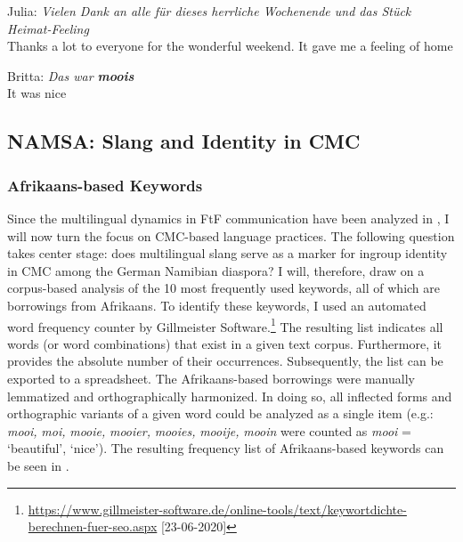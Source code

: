 \documentclass[output=paper]{langsci/langscibook}
\begin{document}
\ea\label{ex:radke:4}
	\ea Julia: \textit{Vielen Dank an alle für dieses herrliche Wochenende und das Stück Heimat-Feeling} \\
	
	Thanks a lot to everyone for the wonderful weekend. It gave me a feeling of home   

	\ex Britta: \textit{Das war \textbf{moois}}\\

	 It was nice
\z
\z
   
\subsection{NAMSA: Slang and Identity in CMC} 
  \label{sec:radke:3.4}
  
  \subsubsection{Afrikaans-based Keywords}
 \label{sec:radke:3.4.1}

Since the multilingual dynamics in FtF communication have been analyzed in , I will now turn the focus on CMC-based language practices. The following question takes center stage: does multilingual slang serve as a marker for ingroup identity in CMC among the German Namibian diaspora? I will, therefore, draw on a corpus-based analysis of the 10 most frequently used keywords, all of which are borrowings from Afrikaans. To identify these keywords, I used an automated word frequency counter by Gillmeister Software.\footnote{\url{https://www.gillmeister-software.de/online-tools/text/keywortdichte-berechnen-fuer-seo.aspx} [23-06-2020]} The resulting list indicates all words (or word combinations) that exist in a given text corpus. Furthermore, it provides the absolute number of their occurrences. Subsequently, the list can be exported to a spreadsheet. The Afrikaans-based borrowings were manually lemmatized and orthographically harmonized. In doing so, all inflected forms and orthographic variants of a given word could be analyzed as a single item (e.g.: \textit{mooi,} \textit{moi,} \textit{mooie,} \textit{mooier,} \textit{mooies,} \textit{mooije,} \textit{mooin} were counted as \textit{mooi} = ‘beautiful’, ‘nice’). The resulting frequency list of Afrikaans-based keywords can be seen in .



  
 
\end{document}
